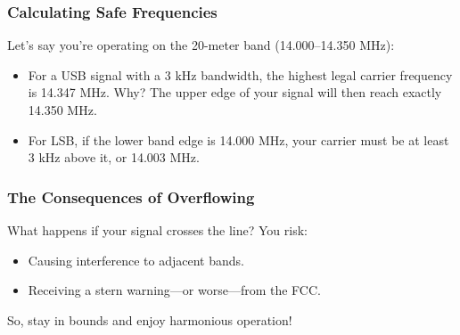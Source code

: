 \subsubsection*{Calculating Safe Frequencies}
Let’s say you’re operating on the 20-meter band (14.000–14.350 MHz):
\begin{itemize}
    \item For a USB signal with a 3 kHz bandwidth, the highest legal carrier frequency is 14.347 MHz. Why? The upper edge of your signal will then reach exactly 14.350 MHz.
    \item For LSB, if the lower band edge is 14.000 MHz, your carrier must be at least 3 kHz above it, or 14.003 MHz.
\end{itemize}

\subsubsection*{The Consequences of Overflowing}
What happens if your signal crosses the line? You risk:
\begin{itemize}
    \item Causing interference to adjacent bands.
    \item Receiving a stern warning—or worse—from the FCC.
\end{itemize}
So, stay in bounds and enjoy harmonious operation!

